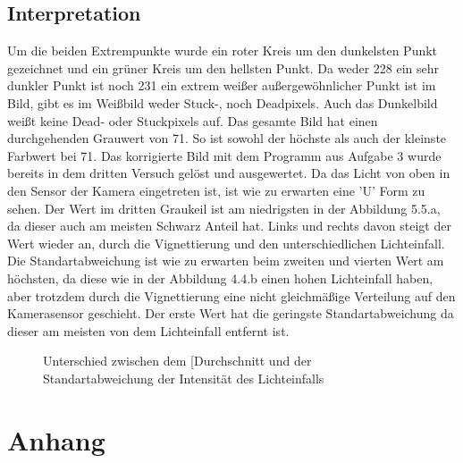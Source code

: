 \documentclass[12pt, oneside, a4paper, \docLanguage]{report}
\begin{document}
\section{Interpretation}
\label{chap:VERSUCH_4_INTERPRETATION}
Um die beiden Extrempunkte wurde ein roter Kreis um den dunkelsten Punkt gezeichnet und ein grüner Kreis um den hellsten Punkt.
Da weder 228 ein sehr dunkler Punkt ist noch 231 ein extrem weißer außergewöhnlicher Punkt ist im Bild, gibt es im Weißbild weder Stuck-, noch Deadpixels.
Auch das Dunkelbild weißt keine Dead- oder Stuckpixels auf.
Das gesamte Bild hat einen durchgehenden Grauwert von 71.
So ist sowohl der höchste als auch der kleinste Farbwert bei 71.
\newline
\newline
Das korrigierte Bild mit dem Programm aus Aufgabe 3 wurde bereits in dem dritten Versuch gelöst und ausgewertet.
\newline
\newline
Da das Licht von oben in den Sensor der Kamera eingetreten ist, ist wie zu erwarten eine 'U' Form zu sehen.
Der Wert im dritten Graukeil ist am niedrigsten in der Abbildung 5.5.a, da dieser auch am meisten Schwarz Anteil hat.
Links und rechts davon steigt der Wert wieder an, durch die Vignettierung und den unterschiedlichen Lichteinfall. 
Die Standartabweichung ist wie zu erwarten beim zweiten und vierten Wert am höchsten, da diese wie in der Abbildung 4.4.b einen hohen Lichteinfall haben, aber trotzdem durch die Vignettierung eine nicht gleichmäßige Verteilung auf den Kamerasensor geschieht.
Der erste Wert hat die geringste Standartabweichung da dieser am meisten von dem Lichteinfall entfernt ist. 
\begin{figure}[hbt!]
  	\centering
	\hfill
	\caption{Unterschied zwischen dem [Durchschnitt und der Standartabweichung der Intensität des Lichteinfalls}
\end{figure}

%
%
\renewcommand\thesection{A.\arabic{section}}
\renewcommand\thesubsection{\thesection.\arabic{subsection}}

\chapter*{Anhang}
\label{chap:APPENDIX}
\addtocounter{chapter}{1}
\setcounter{section}{0}
\end{document}
